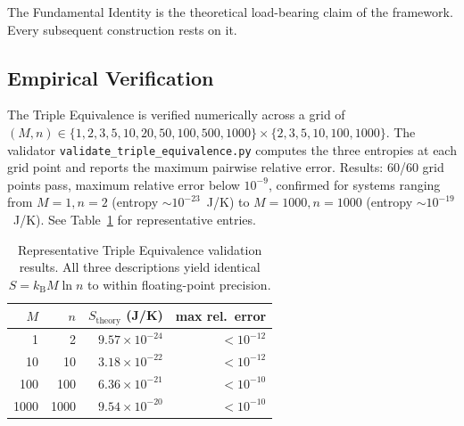 \documentclass[twocolumn,11pt,a4paper]{article}
\newcommand{\kb}{k_{\mathrm{B}}}
\begin{document}
The Fundamental Identity is the theoretical load-bearing claim of the framework. Every subsequent construction rests on it.

\subsection{Empirical Verification}

The Triple Equivalence is verified numerically across a grid of $(M, n) \in \{1, 2, 3, 5, 10, 20, 50, 100, 500, 1000\} \times \{2, 3, 5, 10, 100, 1000\}$. The validator \texttt{validate\_triple\_equivalence.py} computes the three entropies at each grid point and reports the maximum pairwise relative error. Results: 60/60 grid points pass, maximum relative error below $10^{-9}$, confirmed for systems ranging from $M = 1, n = 2$ (entropy $\sim 10^{-23}$~J/K) to $M = 1000, n = 1000$ (entropy $\sim 10^{-19}$~J/K). See Table~\ref{tab:triple} for representative entries.

\begin{table}[!htbp]
\centering
\caption{Representative Triple Equivalence validation results. All three descriptions yield identical $S = \kb M \ln n$ to within floating-point precision.}
\label{tab:triple}
\begin{tabular}{rrrr}
\toprule
$M$ & $n$ & $S_{\text{theory}}$ (J/K) & max rel.\ error \\
\midrule
1    & 2    & $9.57 \times 10^{-24}$ & $< 10^{-12}$ \\
10   & 10   & $3.18 \times 10^{-22}$ & $< 10^{-12}$ \\
100  & 100  & $6.36 \times 10^{-21}$ & $< 10^{-10}$ \\
1000 & 1000 & $9.54 \times 10^{-20}$ & $< 10^{-10}$ \\
\bottomrule
\end{tabular}
\end{table}
\end{document}
